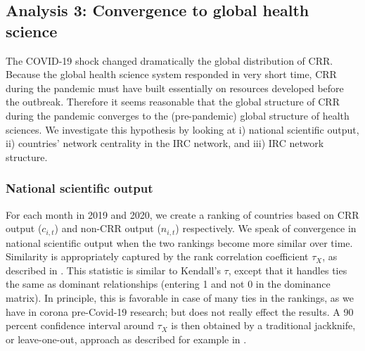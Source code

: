 

\subsection{Analysis 3: Convergence to global health science}
\label{subsec:Analysis3}

The COVID-19 shock changed dramatically the global distribution of CRR.  Because the global health science system responded in very short time, CRR during the pandemic must have built essentially on resources developed before the outbreak. Therefore it seems reasonable that the global structure of CRR during the pandemic converges to the (pre-pandemic) global structure of health sciences. We investigate this hypothesis by looking at i) national scientific output, ii) countries' network centrality in the IRC network, and iii) IRC network structure. 

\subsubsection{National scientific output}

For each month in 2019 and 2020, we create a ranking of countries based on CRR output ($c_{i,t}$) and non-CRR output ($n_{i,t}$) respectively. We speak of convergence in national scientific output when the two rankings become more similar over time. Similarity is appropriately captured by the rank correlation coefficient $\tau_X$, as described in \cite{emond2002new}. This statistic is similar to Kendall's $\tau$, except that it handles ties the same as dominant relationships (entering 1 and not 0 in the dominance matrix). In principle, this is favorable in case of many ties in the rankings, as we have in corona pre-Covid-19 research; but does not really effect the results. A 90 percent confidence interval around $\tau_X$ is then obtained by a traditional jackknife, or leave-one-out, approach as described for example in \cite{abdi2010jackknife}.


